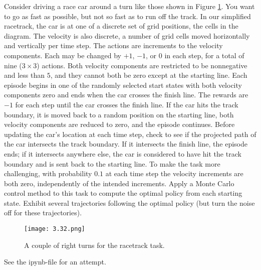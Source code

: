 
\begin{exercise}

Consider driving a race car around a turn like those shown in Figure \ref{fig:4.32}.
You want to go as fast as possible, but not so fast as to run off the track.
In our simplified racetrack, the car is at one of a discrete set of grid positions, the cells in the diagram.
The velocity is also discrete, a number of grid cells moved horizontally and vertically per time step.
The actions are increments to the velocity components.
Each may be changed by $+1$, $-1$, or $0$ in each step, for a total of nine ($3 \times 3$) actions.
Both velocity components are restricted to be nonnegative and less than $5$, and they cannot both be zero except at the starting line.
Each episode begins in one of the randomly selected start states with both velocity components zero and ends when the car crosses the finish line.
The rewards are $-1$ for each step until the car crosses the finish line.
If the car hits the track boundary, it is moved back to a random position on the starting line, both velocity components are reduced to zero, and the episode continues.
Before updating the car's location at each time step, check to see if the projected path of the car intersects the track boundary.
If it intersects the finish line, the episode ends;
if it intersects anywhere else, the car is considered to have hit the track boundary and is sent back to the starting line.
To make the task more challenging, with probability $0.1$ at each time step the velocity increments are both zero, independently of the intended increments.
Apply a Monte Carlo control method to this task to compute the optimal policy from each starting state.
Exhibit several trajectories following the optimal policy (but turn the noise off for these trajectories).

\setcounter{section}{5}
\setcounter{figure}{4}

\begin{figure}[H]
    \centering
    \texttt{[image: 3.32.png]}
    \caption{A couple of right turns for the racetrack task.}
    \label{fig:4.32}
\end{figure}

\end{exercise}


\begin{solution}

See the ipynb-file for an attempt.

\end{solution}

